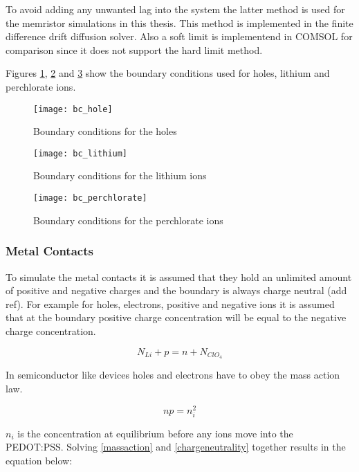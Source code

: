 \begin{doublespace}
To avoid adding any unwanted lag into the system the latter method is used for the memristor simulations in this thesis. This method is implemented in the finite difference drift diffusion solver. Also a soft limit is implementend in COMSOL for comparison since it does not support the hard limit method.

Figures \ref{bc_hole}, \ref{bc_lithium} and \ref{bc_perchlorate} show the boundary conditions used for holes, lithium and perchlorate ions.

\begin{figure}[!htp]
\centering
\texttt{[image: bc\_hole]}
\caption{Boundary conditions for the holes } 
\label{bc_hole}
\end{figure}

\begin{figure}[!htp]
\centering
\texttt{[image: bc\_lithium]}
\caption{Boundary conditions for the lithium ions } 
\label{bc_lithium}
\end{figure}

\begin{figure}[!htp]
\centering
\texttt{[image: bc\_perchlorate]}
\caption{Boundary conditions for the perchlorate ions } 
\label{bc_perchlorate}
\end{figure}




\clearpage
\subsubsection{Metal Contacts}
To simulate the metal contacts it is assumed that they hold an unlimited amount of positive and negative charges and the boundary is always charge neutral (add ref). For example for holes, electrons, positive and negative ions it is assumed that at the boundary positive charge concentration will be equal to the negative charge concentration. 

\begin{equation}
 N_{Li} + p = n + N_{ClO_{4}}
\label{chargeneutrality}
\end{equation}

In semiconductor like devices holes and electrons have to obey the mass action law.

\begin{equation}
np=n_i^2
\label{massaction}
\end{equation}

$n_i$ is the concentration at equilibrium before any ions move into the PEDOT:PSS. Solving \eqref{massaction} and \eqref{chargeneutrality} together results in the equation below:


\end{doublespace}
